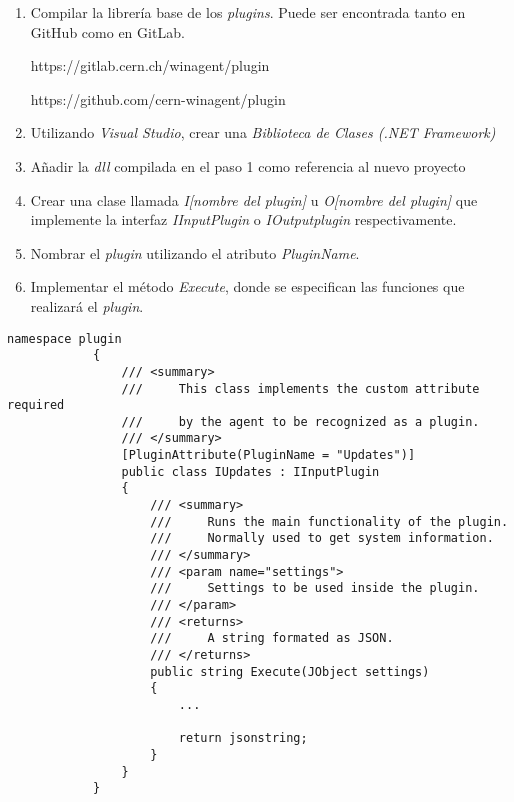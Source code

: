         \begin{enumerate}
            \item Compilar la librería base de los \textit{plugins}. Puede ser encontrada tanto en GitHub como en GitLab.
            
            https://gitlab.cern.ch/winagent/plugin
            
            https://github.com/cern-winagent/plugin
            
            \item Utilizando \textit{Visual Studio}, crear una \textit{Biblioteca de Clases (.NET Framework)}
            
            \item Añadir la \textit{dll} compilada en el paso 1 como referencia al nuevo proyecto
            
            \item Crear una clase llamada \textit{I[nombre del plugin]} u \textit{O[nombre del plugin]} que implemente la interfaz \textit{IInputPlugin} o \textit{IOutputplugin} respectivamente.
            
            \item Nombrar el \textit{plugin} utilizando el atributo \textit{PluginName}.
            
            \item Implementar el método \textit{Execute}, donde se especifican las funciones que realizará el \textit{plugin}.
        \end{enumerate}
    
        \begin{lstlisting}[style=csharp, caption=Plugin de entrada]
            namespace plugin
            {
                /// <summary>
                ///     This class implements the custom attribute required
                ///     by the agent to be recognized as a plugin.
                /// </summary>
                [PluginAttribute(PluginName = "Updates")]
                public class IUpdates : IInputPlugin
                {
                    /// <summary>
                    ///     Runs the main functionality of the plugin.
                    ///     Normally used to get system information.
                    /// </summary>
                    /// <param name="settings">
                    ///     Settings to be used inside the plugin.
                    /// </param>
                    /// <returns>
                    ///     A string formated as JSON.
                    /// </returns>
                    public string Execute(JObject settings)
                    {
                        ...
            
                        return jsonstring;
                    }
                }
            }
        \end{lstlisting}
        
